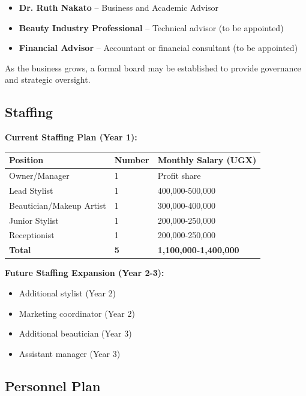\documentclass[a4paper,12pt]{article}
\begin{document}
\begin{itemize}[leftmargin=2em]
    \item \textbf{Dr. Ruth Nakato} -- Business and Academic Advisor
    \item \textbf{Beauty Industry Professional} -- Technical advisor (to be appointed)
    \item \textbf{Financial Advisor} -- Accountant or financial consultant (to be appointed)
\end{itemize}

As the business grows, a formal board may be established to provide governance and strategic oversight.

\subsection{Staffing}

\textbf{Current Staffing Plan (Year 1):}

\begin{tabular}{|l|l|l|}
\hline
\textbf{Position} & \textbf{Number} & \textbf{Monthly Salary (UGX)} \\
\hline
Owner/Manager & 1 & Profit share \\
Lead Stylist & 1 & 400,000-500,000 \\
Beautician/Makeup Artist & 1 & 300,000-400,000 \\
Junior Stylist & 1 & 200,000-250,000 \\
Receptionist & 1 & 200,000-250,000 \\
\hline
\textbf{Total} & \textbf{5} & \textbf{1,100,000-1,400,000} \\
\hline
\end{tabular}

\vspace{1em}

\textbf{Future Staffing Expansion (Year 2-3):}
\begin{itemize}[leftmargin=2em]
    \item Additional stylist (Year 2)
    \item Marketing coordinator (Year 2)
    \item Additional beautician (Year 3)
    \item Assistant manager (Year 3)
\end{itemize}

\subsection{Personnel Plan}
\end{document}
